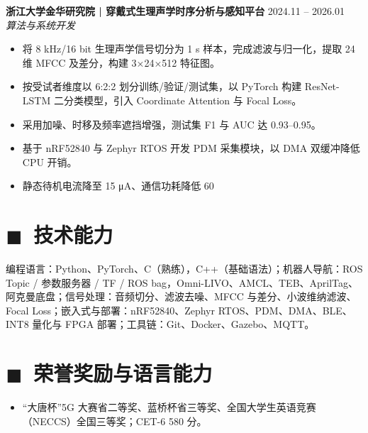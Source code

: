 \documentclass[11pt]{article}
\newlength{\interProjectSpacing}
\newcommand{\projectsep}{\vspace{\interProjectSpacing}}
\newlength{\intraProjectTitleSep}
\newcommand{\titlebreak}{\\[\intraProjectTitleSep]}
\newlength{\intraProjectListTopSep}
\begin{document}
\projectsep

\textbf{浙江大学金华研究院 | 穿戴式生理声学时序分析与感知平台} \hfill 2024.11 -- 2026.01 \titlebreak
\textit{算法与系统开发}\titlebreak
\begin{itemize}[nosep, topsep=\intraProjectListTopSep]
    \item 将 8 kHz/16 bit 生理声学信号切分为 1 s 样本，完成滤波与归一化，提取 24 维 MFCC 及差分，构建 3×24×512 特征图。
    \item 按受试者维度以 6:2:2 划分训练/验证/测试集，以 PyTorch 构建 ResNet-LSTM 二分类模型，引入 Coordinate Attention 与 Focal Loss。
    \item 采用加噪、时移及频率遮挡增强，测试集 F1 与 AUC 达 0.93--0.95。
    \item 基于 nRF52840 与 Zephyr RTOS 开发 PDM 采集模块，以 DMA 双缓冲降低 CPU 开销。
    \item 静态待机电流降至 15 μA、通信功耗降低 60%
\end{itemize}

\section{\color{CVBlue}\ensuremath{\blacksquare}\ 技术能力}
编程语言：Python、PyTorch、C（熟练），C++（基础语法）；机器人导航：ROS Topic / 参数服务器 / TF / ROS bag，Omni-LIVO、AMCL、TEB、AprilTag、阿克曼底盘；信号处理：音频切分、滤波去噪、MFCC 与差分、小波维纳滤波、Focal Loss；嵌入式与部署：nRF52840、Zephyr RTOS、PDM、DMA、BLE、INT8 量化与 FPGA 部署；工具链：Git、Docker、Gazebo、MQTT。

\section{\color{CVBlue}\ensuremath{\blacksquare}\ 荣誉奖励与语言能力}
\begin{itemize}[nosep]
    \item “大唐杯”5G 大赛省二等奖、蓝桥杯省三等奖、全国大学生英语竞赛（NECCS）全国三等奖；CET-6 580 分。
\end{itemize}
\end{document}
